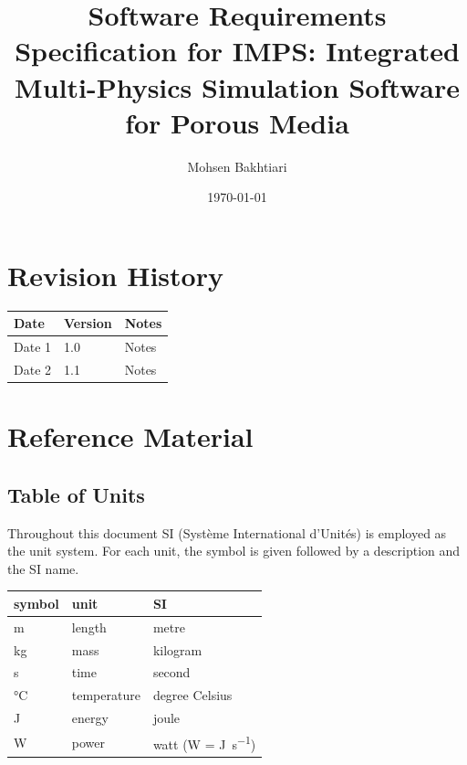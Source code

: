 \documentclass[12pt]{article}
\newcommand{\progname}{IMPS}
\begin{document}
\title{Software Requirements Specification for \progname: Integrated Multi-Physics Simulation Software for Porous Media}
\author{Mohsen Bakhtiari}
\date{\today}
\maketitle

\newpage
{}
\tableofcontents
\newpage

\section*{Revision History}

\begin{tabularx}{\textwidth}{p{3cm}p{2cm}X}
\toprule {\bf Date} & {\bf Version} & {\bf Notes}\\
\midrule
Date 1 & 1.0 & Notes\\
Date 2 & 1.1 & Notes\\
\bottomrule
\end{tabularx}

\newpage
\section{Reference Material}

\subsection{Table of Units}

Throughout this document SI (Syst\`{e}me International d'Unit\'{e}s) is employed
as the unit system. For each unit, the symbol is given followed by a description
and the SI name.

\renewcommand{\arraystretch}{1.2}
\noindent \begin{tabular}{l l l}
  \toprule
  \textbf{symbol} & \textbf{unit} & \textbf{SI}\\
  \midrule
  \si{\metre} & length & metre\\
  \si{\kilogram} & mass & kilogram\\
  \si{\second} & time & second\\
  \si{\celsius} & temperature & degree Celsius\\
  \si{\joule} & energy & joule\\
  \si{\watt} & power & watt (W = \si{\joule\per\second})\\
  \bottomrule
\end{tabular}
\end{document}
